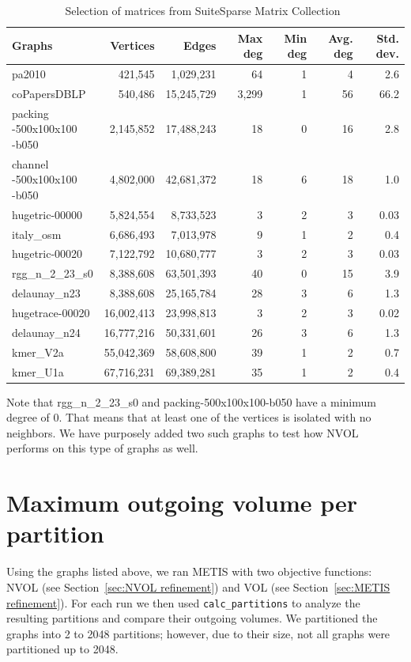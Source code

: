 \begin{table}[h]
    \centering
	\small
	\setlength{\tabcolsep}{3pt}
	\begin{tabular}{|l|r|r|r|r|r|r|}
		\hline
		\textbf{Graphs} & \textbf{Vertices} & \textbf{Edges} & \textbf{Max deg} & \textbf{Min deg} & \textbf{Avg. deg} & \textbf{Std. dev.}\\
		\hline
		pa2010 & 421,545 & 1,029,231 & 64 & 1 & 4 & 2.6\\
		\hline
		coPapersDBLP & 540,486 & 15,245,729 & 3,299 & 1 & 56 & 66.2\\
		\hline
		\makecell[l]{packing\\-500x100x100\\-b050} & 2,145,852 & 17,488,243 & 18 & 0 & 16 & 2.8\\
		\hline
		\makecell[l]{channel\\-500x100x100\\-b050} & 4,802,000 & 42,681,372 & 18 & 6 & 18 & 1.0\\
		\hline
		hugetric-00000 & 5,824,554 & 8,733,523 & 3 & 2 & 3 & 0.03\\
		\hline
		italy\_osm & 6,686,493 & 7,013,978 & 9 & 1 & 2 & 0.4\\
		\hline
		hugetric-00020 & 7,122,792 & 10,680,777 & 3 & 2 & 3 & 0.03\\
		\hline
		rgg\_n\_2\_23\_s0 & 8,388,608 & 63,501,393 & 40 & 0 & 15 & 3.9\\
		\hline
		delaunay\_n23 & 8,388,608 & 25,165,784 & 28 & 3 & 6 & 1.3\\
		\hline 
		hugetrace-00020 & 16,002,413 & 23,998,813 & 3 & 2 & 3 & 0.02\\
		\hline
		delaunay\_n24 & 16,777,216 & 50,331,601 & 26 & 3 & 6 & 1.3\\
		\hline
		kmer\_V2a & 55,042,369 & 58,608,800 & 39 & 1 & 2 & 0.7\\
		\hline
		kmer\_U1a & 67,716,231 & 69,389,281 & 35 & 1 & 2 & 0.4\\
		\hline
	\end{tabular}
	\caption{Selection of matrices from SuiteSparse Matrix Collection~\cite{suitesparse}}
	\label{tab:suitesparse}
\end{table}

Note that rgg\_n\_2\_23\_s0 and packing-500x100x100-b050 have a minimum degree of 0. That means that at least one of the vertices is isolated with no neighbors. We have purposely added two such graphs to test how NVOL performs on this type of graphs as well.

\section{Maximum outgoing volume per partition}
Using the graphs listed above, we ran METIS with two objective functions: NVOL (see Section~\ref{sec:NVOL refinement}) and VOL (see Section~\ref{sec:METIS refinement}). For each run we then used \texttt{calc\_partitions} to analyze the resulting partitions and compare their outgoing volumes. We partitioned the graphs into 2 to 2048 partitions; however, due to their size, not all graphs were partitioned up to 2048.

